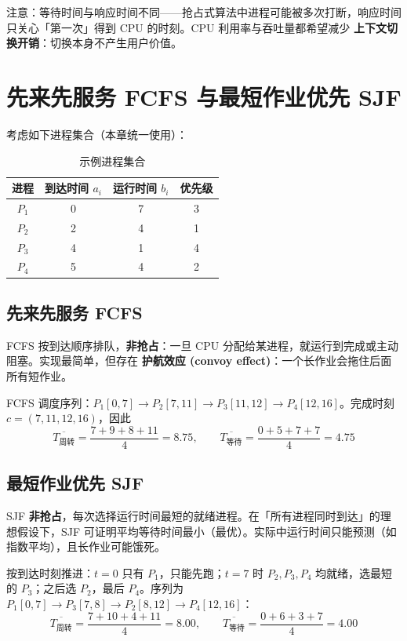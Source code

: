 \noindent 注意：等待时间与响应时间不同——抢占式算法中进程可能被多次打断，响应时间只关心「第一次」得到 CPU 的时刻。CPU 利用率与吞吐量都希望减少 \textbf{上下文切换开销}：切换本身不产生用户价值。

\section{先来先服务 FCFS 与最短作业优先 SJF}

考虑如下进程集合（本章统一使用）：

\begin{table}[H]
\centering
\caption{示例进程集合}
\begin{tabulary}{\textwidth}{CCCC}
\toprule
进程 & 到达时间 $a_i$ & 运行时间 $b_i$ & 优先级 \\
\midrule
$P_1$ & 0 & 7 & 3 \\
$P_2$ & 2 & 4 & 1 \\
$P_3$ & 4 & 1 & 4 \\
$P_4$ & 5 & 4 & 2 \\
\bottomrule
\end{tabulary}
\end{table}

\subsection{先来先服务 FCFS}

FCFS 按到达顺序排队，\textbf{非抢占}：一旦 CPU 分配给某进程，就运行到完成或主动阻塞。实现最简单，但存在 \textbf{护航效应 (convoy effect)}：一个长作业会拖住后面所有短作业。

FCFS 调度序列：$P_1[0,7] \to P_2[7,11] \to P_3[11,12] \to P_4[12,16]$。完成时刻 $c = (7,11,12,16)$，因此
\begin{equation}
    \overline{T_{\text{周转}}} = \frac{7+9+8+11}{4} = 8.75,\qquad
    \overline{T_{\text{等待}}} = \frac{0+5+7+7}{4} = 4.75
\end{equation}

\subsection{最短作业优先 SJF}

SJF \textbf{非抢占}，每次选择运行时间最短的就绪进程。在「所有进程同时到达」的理想假设下，SJF 可证明平均等待时间最小（最优）。实际中运行时间只能预测（如指数平均），且长作业可能饿死。

按到达时刻推进：$t=0$ 只有 $P_1$，只能先跑；$t=7$ 时 $P_2,P_3,P_4$ 均就绪，选最短的 $P_3$；之后选 $P_2$，最后 $P_4$。序列为 $P_1[0,7] \to P_3[7,8] \to P_2[8,12] \to P_4[12,16]$：
\begin{equation}
    \overline{T_{\text{周转}}} = \frac{7+10+4+11}{4} = 8.00,\qquad
    \overline{T_{\text{等待}}} = \frac{0+6+3+7}{4} = 4.00
\end{equation}

